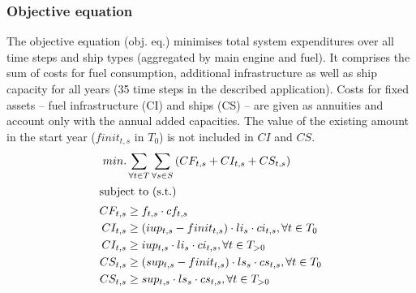 \documentclass[article]{elsarticle}
\begin{document}
\subsubsection{Objective equation}\label{subsubsec:obj}
The objective equation (obj. eq.) minimises total system expenditures over all time steps and ship types (aggregated by main engine and fuel). It comprises the sum of  costs for fuel consumption, additional infrastructure as well as ship capacity for all years (35 time steps in the described application). Costs for fixed assets -- fuel infrastructure (CI) and ships (CS) -- are given as annuities and account only with the annual added capacities. The value of the existing amount in the start year ($finit_{t,s}$ in $T_0$) is not included in $CI$ and $CS$.
\begin{subequations}
    \begin{align}
        min. &\sum_{\forall t \in T}\sum_{\forall s \in S}\left( CF_{t, s} + CI_{t, s} + CS_{t, s} \right)\label{eq:objective}\\
        \intertext{subject to (s.t.)}
        CF_{t, s} &\geq f_{t,s} \cdot cf_{t,s}\\
        CI_{t, s} &\geq \left( iup_{t,s} - finit_{t, s} \right) \cdot li_{s} \cdot ci_{t,s}, \forall t \in T_0\\
        CI_{t, s} &\geq iup_{t,s} \cdot li_{s} \cdot ci_{t,s}, \forall t \in T_{>0}\\
        CS_{t, s} &\geq \left( sup_{t,s} - finit_{t, s} \right) \cdot ls_{s} \cdot cs_{t,s}, \forall t \in T_0\\
        CS_{t, s} &\geq sup_{t,s} \cdot ls_{s} \cdot cs_{t,s}, \forall t \in T_{>0}
    \end{align}
\end{subequations}

\glsdisablehyper
\glsaddall
\begin{table}[h]
\begin{mdframed}
\footnotesize{
\begin{multicols}{2}
\printglossary[style=tree,type=obj]
\end{multicols}
}
\end{mdframed}
\label{box:nomenclature_obj}
\end{table}
\end{document}

